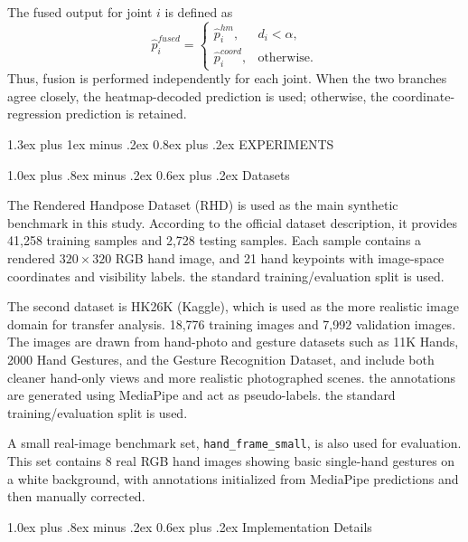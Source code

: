 \documentclass[10pt,letterpaper]{article}
\makeatletter
\renewcommand\section{\@startsection{section}{1}{\z@}%
  {1.3ex plus 1ex minus .2ex}%
  {0.8ex plus .2ex}%
  {\centering\normalfont\small\scshape}}
\renewcommand\subsection{\@startsection{subsection}{2}{\z@}%
  {1.0ex plus .8ex minus .2ex}%
  {0.6ex plus .2ex}%
  {\normalfont\itshape}}
\makeatother
\begin{document}
The fused output for joint \(i\) is defined as
\begin{equation}
\hat{p}^{fused}_i =
\begin{cases}
\hat{p}^{hm}_i, & d_i < \alpha, \\
\hat{p}^{coord}_i, & \text{otherwise.}
\end{cases}
\label{eq:fused-output}
\end{equation}
Thus, fusion is performed independently for each joint. When the two branches agree closely, the heatmap-decoded prediction is used; otherwise, the coordinate-regression prediction is retained.

\section{EXPERIMENTS}

\subsection{Datasets}

The Rendered Handpose Dataset (RHD) is used as the main synthetic benchmark in this study. According to the official dataset description, it provides 41,258 training samples and 2,728 testing samples. Each sample contains a rendered $320 \times 320$ RGB hand image, and 21 hand keypoints with image-space coordinates and visibility labels. the standard training/evaluation split is used.

The second dataset is HK26K (Kaggle), which is used as the more realistic image domain for transfer analysis. 18,776 training images and 7,992 validation images. The images are drawn from hand-photo and gesture datasets such as 11K Hands, 2000 Hand Gestures, and the Gesture Recognition Dataset, and include both cleaner hand-only views and more realistic photographed scenes. the annotations are generated using MediaPipe and act as pseudo-labels. the standard training/evaluation split is used.

A small real-image benchmark set, \texttt{hand\_frame\_small}, is also used for evaluation. This set contains 8 real RGB hand images showing basic single-hand gestures on a white background, with annotations initialized from MediaPipe predictions and then manually corrected.

\subsection{Implementation Details}
\end{document}
